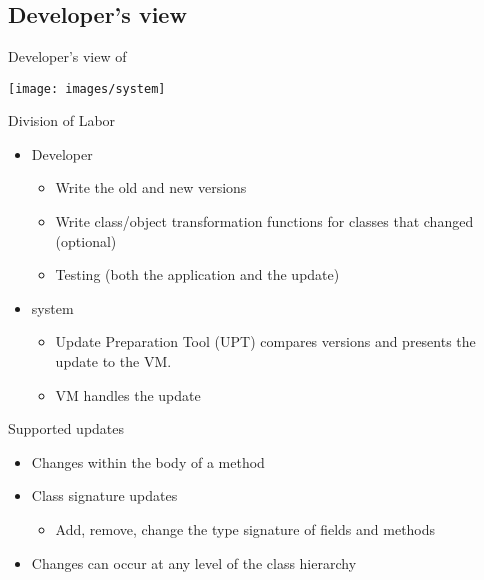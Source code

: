
\section{\DSU}
\ShowTOC[currentsection]
\subsection{Developer's view}

\begin{frame}{Developer's view of \DSU{}}%
\begin{center}
\texttt{[image: images/system]}
\end{center}
\end{frame}

\begin{frame}{Division of Labor}%
\begin{itemize}
\item Developer
  \begin{itemize}
  \item Write the old and new versions
  \item Write class/object transformation functions for classes that
        changed (optional)
  \item Testing (both the application and the update)
  \end{itemize}
\item \DSU{} system
  \begin{itemize}
  \item Update Preparation Tool (UPT) compares versions and presents the
        update to the \DSU{} VM.
  \item \DSU{} VM handles the update
  \end{itemize}
\end{itemize}
\end{frame}

\begin{frame}{Supported updates}%
\begin{itemize}
\item Changes within the body of a method
\item Class signature updates
  \begin{itemize}
  \item Add, remove, change the type signature of fields and methods
  \end{itemize}
\item Changes can occur at any level of the class hierarchy
\end{itemize}
\end{frame}


